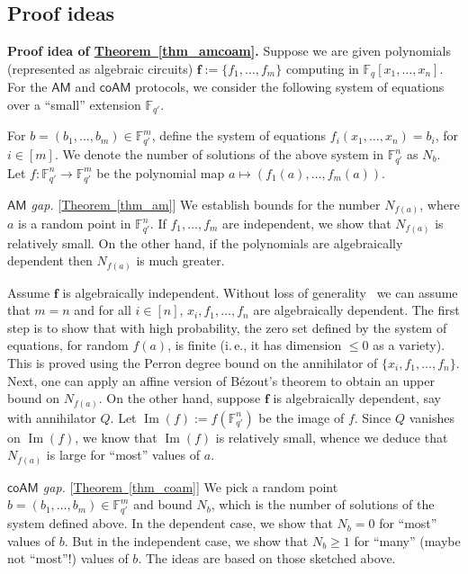 \documentclass[11pt]{article}
\numberwithin{equation}{section}
\theoremstyle{definition}
\theoremstyle{plain}
\newcommand{\cclass}[1]{\textsf{#1}}
\newcommand{\ie}{i.\,e.}
\newcommand{\expref}[2]{\hyperref[#2]{#1~\ref{#2}}}
\newcommand{\F}{\mathbb{F}}
\DeclareMathOperator{\im}{\mathrm{Im}}
\newcommand{\AM}{\cclass{AM}\xspace}  %
\newcommand{\coAM}{\cclass{coAM}\xspace}  %
\begin{document}
%
%
%


 \subsection{Proof ideas}\label{idea}
%
 
\smallskip\noindent
\textbf{Proof idea of \expref{Theorem}{thm_amcoam}.}  
Suppose we are given polynomials (represented as algebraic circuits) $\mathbf{f}:= \{f_1,\ldots,f_m\}$ computing in $\F_q[x_1,\dots,x_n]$. For the
$\AM$ and $\coAM$ protocols, we consider the following system of equations over a ``small'' extension $\F_{q'}$. %
%
  
 For $b=(b_1,\dots,b_m)\in \F_{q'}^m$, define the system of equations $f_i(x_1,\dots,x_n)=b_i$, for $i\in [m]$. We denote the number of solutions of the above system in $\F_{q'}^n$ as $N_b$. Let $f:\F_{q'}^n\to \F_{q'}^m$ be the polynomial map $a\mapsto (f_1(a),\dots,f_m(a))$.

 \emph{$\AM$ gap.} [\expref{Theorem}{thm_am}] We establish bounds for the number $N_{f(a)}$, where $a$ is a random point in $\F_{q'}^n$. If $f_1,\dots,f_m$ are independent, we show that  $N_{f(a)}$ is relatively small.
%
On the other hand,   %
if the polynomials are algebraically dependent then $N_{f(a)}$ is much
%
greater.   %

Assume $\mathbf{f}$
%
is   %
algebraically independent. Without loss of generality~\cite[Section~2]{pandey2016algebraic} we can assume that $m=n$ and for all $i\in[n]$, 
%
$x_i,f_1,\ldots,f_n$ %
are algebraically dependent. 
The first step is to show that
%
 with high probability, the zero set defined by the system of equations, for random $f(a)$, is finite (\ie, it has dimension $\leq 0$ as a variety). %
%
This is proved using the Perron degree bound on the annihilator of $\{x_i,f_1,\ldots,f_n\}$. 
Next, one can apply an affine version of 
%
B\'ezout's %
theorem to
%
obtain an upper bound on   %
$N_{f(a)}$. 
On the other hand, suppose $\mathbf{f}$
%
is  %
algebraically dependent, say with annihilator $Q$. Let $\im(f):=f(\F_{q'}^n)$ be the image of $f$. Since $Q$ vanishes on $\im(f)$, we know that $\im(f)$ is relatively small, whence we deduce that $N_{f(a)}$ is large for ``most''
%
values of $a$.   %
 
\emph{$\coAM$ gap.} [\expref{Theorem}{thm_coam}] We pick a random point $b=(b_1,\dots,b_m)\in \F_{q'}^m$ and bound $N_b$, which is the number of solutions of the system defined above.
In the dependent case, we show that $N_b=0$ for ``most''
%
values of $b$.  %
But in the independent case, we show that $N_b\ge1$ for ``many''
%
(maybe   %
not ``most''!)
%
values of $b$.   %
The ideas are based on those sketched above.
%
\end{document}
